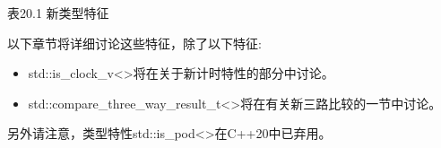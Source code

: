 \begin{center}
表20.1 新类型特征
\end{center}

以下章节将详细讨论这些特征，除了以下特征:

\begin{itemize}
\item 
std::is\_clock\_v<>将在关于新计时特性的部分中讨论。

\item 
std::compare\_three\_way\_result\_t<>将在有关新三路比较的一节中讨论。
\end{itemize}

另外请注意，类型特性std::is\_pod<>在C++20中已弃用。












